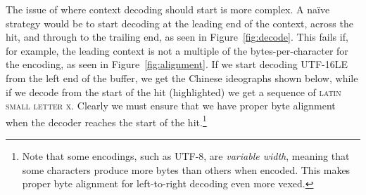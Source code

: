 \documentclass[5p,final,number,sort&compress]{elsarticle}
\begin{document}
The issue of where context decoding should start is more complex. A na\"ive strategy would be to start decoding at the leading end of the context, across the hit, and through to the trailing end, as seen in Figure~\ref{fig:decode}. This fails if, for example, the leading context is not a multiple of the bytes-per-character for the encoding, as seen in Figure~\ref{fig:alignment}. If we start decoding UTF-16LE from the left end of the buffer, we get the Chinese ideographs shown below, while if we decode from the start of the hit (highlighted) we get a sequence of \textsc{latin small letter x}. Clearly we must ensure that we have proper byte alignment when the decoder reaches the start of the hit.\footnote{Note that some encodings, such as UTF-8, are \emph{variable width}, meaning that some characters produce more bytes than others when encoded. This makes proper byte alignment for left-to-right decoding even more vexed.}
\end{document}
